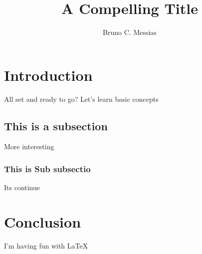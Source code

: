 \documentclass{article}
\title{A Compelling Title}
\author{Bruno C. Messias}
\begin{document}
\maketitle

\section{Introduction}

All set and ready to go?
Let's learn basic concepts 

\subsection{This is a subsection}

More interesting

\subsubsection{This is Sub subsectio}

Its continue

\section{Conclusion}

I'm having fun with \LaTeX
\end{document}
